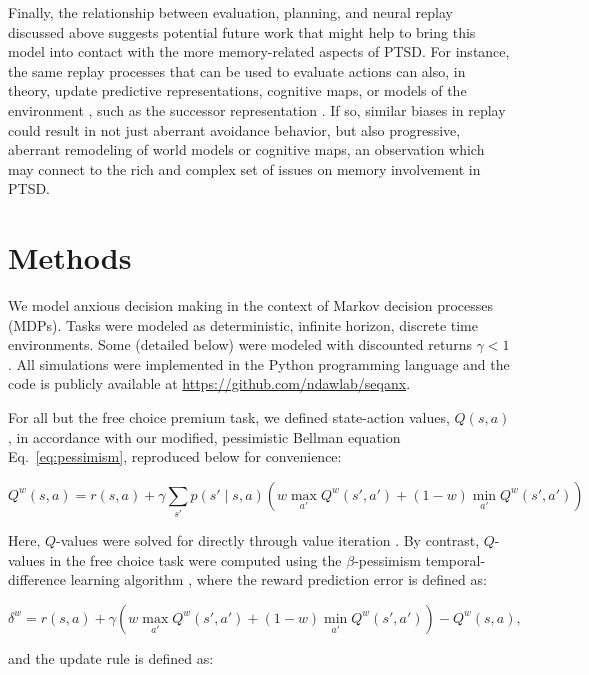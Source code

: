 \documentclass[manuscript]{stjour}
\begin{document}
Finally, the relationship between evaluation, planning, and neural replay discussed above suggests potential future work that might help to bring this model into contact with the more memory-related aspects of PTSD. For instance, the same replay processes that can be used to evaluate actions can also, in theory, update predictive representations, cognitive maps, or models of the environment \citep{russek_predictive_2017}, such as the successor representation \citep{dayan1993, momennejad_successor_2017}. If so, similar biases in replay could result in not just aberrant avoidance behavior, but also progressive, aberrant remodeling of world models or cognitive maps, an observation which may connect to the rich and complex set of issues on memory involvement in PTSD.

\section{Methods}

We model anxious decision making in the context of Markov decision processes (MDPs). Tasks were modeled as deterministic, infinite horizon, discrete time environments. Some (detailed below) were modeled with discounted returns $\gamma < 1$. All simulations were implemented in the Python programming language and the code is publicly available at \url{https://github.com/ndawlab/seqanx}.

For all but the free choice premium task, we defined state-action values, $Q(s,a)$, in accordance with our modified, pessimistic Bellman equation Eq.~\ref{eq:pessimism}, reproduced below for convenience:

\begin{equation*}
Q^w(s,a) = r(s,a) + \gamma \sum_{s'} p(s' \mid s,a) \left( w \max_{a'} Q^w(s',a') + (1 - w) \min_{a'} Q^w(s',a') \right)
\end{equation*}

Here, $Q$-values were solved for directly through value iteration \citep{SuttonBarto2018}. By contrast, $Q$-values in the free choice task were computed using the $\beta$-pessimism temporal-difference learning algorithm \citep{Gaskett2003}, where the reward prediction error is defined as:

\begin{equation*}
\delta^w = r(s,a) + \gamma \left( w \max_{a'} Q^w(s',a') + (1 - w) \min_{a'} Q^w(s',a') \right) - Q^w(s,a), 
\end{equation*}

and the update rule is defined as:
\end{document}
